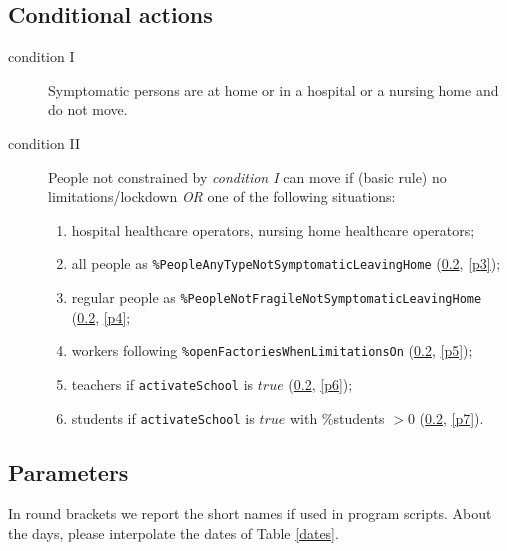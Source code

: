 \documentclass[graybox]{svmult}
\begin{document}
\subsection{Conditional actions}
\label{cond}

\begin{description}

\item [condition I] Symptomatic persons are at home or in a hospital or a nursing home and do not move. 

\item [condition II] People not constrained by \emph{condition I} can move if (basic rule) no limitations/lockdown \emph{OR} one of the following situations:

\begin{enumerate}
\item hospital healthcare operators, nursing home healthcare operators;

\item all people as \verb|%PeopleAnyTypeNotSymptomaticLeavingHome| 
(\ref{par}, \ref{p3});

\item regular people as \verb|%PeopleNotFragileNotSymptomaticLeavingHome|
(\ref{par}, \ref{p4};

\item workers following \verb|%openFactoriesWhenLimitationsOn|
(\ref{par}, \ref{p5});

\item teachers if \verb|activateSchool| is $true$
(\ref{par}, \ref{p6});

\item students if \verb|activateSchool| is $true$ with \%students $>0$
(\ref{par}, \ref{p7}).

\end{enumerate}

\end{description}


\subsection{Parameters}\label{par}

In round brackets we report the short names if used in program scripts. About the days, please interpolate the dates of Table \ref{dates}.
\end{document}
